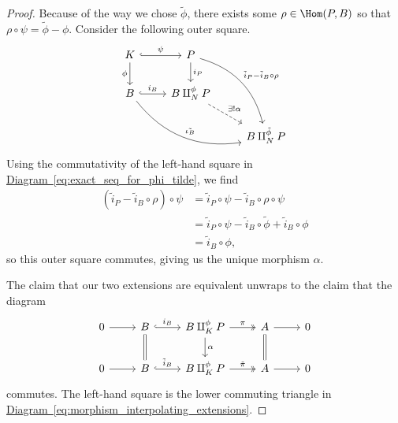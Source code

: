 \documentclass[main.tex]{subfiles}
\begin{document}
\begin{proof}
  Because of the way we chose $\tilde{\phi}$, there exists some $\rho \in \Hom(P, B)$ so that $\rho \circ \psi = \tilde{\phi} - \phi$. Consider the following outer square.
  \begin{equation}
    \label{eq:morphism_interpolating_extensions}
    \begin{tikzcd}
      K
      \arrow[r, hook, "\psi"]
      \arrow[d, swap, "\phi"]
      & P
      \arrow[ddr, bend left, "\tilde{i}_{P} - \tilde{i}_{B} \circ \rho"]
      \arrow[d, "i_{P}"]
      \\
      B
      \arrow[r, hook, "i_{B}"]
      \arrow[rrd, bend right, "\tilde{\iota_{B}}"]
      & B \amalg_{N}^{\phi} P
      \arrow[dr, dashed, "\exists!\alpha"]
      \\
      && B \amalg_{N}^{\tilde{\phi}} P
    \end{tikzcd}
  \end{equation}
  Using the commutativity of the left-hand square in \hyperref[eq:exact_seq_for_phi_tilde]{Diagram~\ref*{eq:exact_seq_for_phi_tilde}}, we find
  \begin{align*}
    (\tilde{i}_{P} - \tilde{i}_{B} \circ \rho) \circ \psi &=\tilde{i}_{P} \circ \psi - \tilde{i}_{B} \circ \rho \circ \psi \\
    &= \tilde{i}_{P} \circ \psi - \tilde{i}_{B} \circ \tilde{\phi} + \tilde{i}_{B} \circ \phi \\
    &= \tilde{i}_{B} \circ \phi,
  \end{align*}
  so this outer square commutes, giving us the unique morphism $\alpha$.

  The claim that our two extensions are equivalent unwraps to the claim that the diagram
  \begin{equation*}
    \begin{tikzcd}
      0
      \arrow[r]
      & B
      \arrow[r, hook, "i_{B}"]
      \arrow[d, equals]
      & B \amalg_{K}^{\phi}P
      \arrow[r, two heads, "\pi"]
      \arrow[d, "\alpha"]
      & A
      \arrow[r]
      \arrow[d, equals]
      & 0
      \\
      0
      \arrow[r]
      & B
      \arrow[r, hook, "\tilde{i}_{B}"]
      & B \amalg_{K}^{\phi}P
      \arrow[r, two heads, "\tilde{\pi}"]
      & A
      \arrow[r]
      & 0
    \end{tikzcd}
  \end{equation*}
  commutes. The left-hand square is the lower commuting triangle in \hyperref[eq:morphism_interpolating_extensions]{Diagram~\ref*{eq:morphism_interpolating_extensions}}.


\end{proof}
\end{document}

